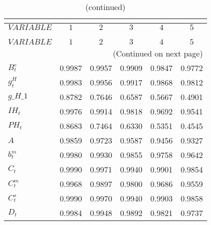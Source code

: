  
\begin{center}
\begin{longtable}{lccccc} 
\caption{AUTOCORRELATION OF SIMULATED VARIABLES}\\
 \label{Table:sim_autocorr_matrix}\\
\toprule 
$VARIABLE                   $	 & 	 $         1$	 & 	 $         2$	 & 	 $         3$	 & 	 $         4$	 & 	 $         5$\\
\midrule \endfirsthead 
\caption{(continued)}\\
 \toprule \\ 
$VARIABLE                   $	 & 	 $         1$	 & 	 $         2$	 & 	 $         3$	 & 	 $         4$	 & 	 $         5$\\
\midrule \endhead 
\midrule \multicolumn{6}{r}{(Continued on next page)} \\ \bottomrule \endfoot 
\bottomrule \endlastfoot 
$B^e_t                      $	 & 	    0.9987	 & 	    0.9957	 & 	    0.9909	 & 	    0.9847	 & 	    0.9772 \\ 
$g^H_t                      $	 & 	    0.9983	 & 	    0.9956	 & 	    0.9917	 & 	    0.9868	 & 	    0.9812 \\ 
$g\_H\_1                    $	 & 	    0.8782	 & 	    0.7646	 & 	    0.6587	 & 	    0.5667	 & 	    0.4901 \\ 
$IH_t                       $	 & 	    0.9976	 & 	    0.9914	 & 	    0.9818	 & 	    0.9692	 & 	    0.9541 \\ 
$PH_t                       $	 & 	    0.8683	 & 	    0.7464	 & 	    0.6330	 & 	    0.5351	 & 	    0.4545 \\ 
$ A                         $	 & 	    0.9859	 & 	    0.9723	 & 	    0.9587	 & 	    0.9456	 & 	    0.9327 \\ 
$ b^m_t                     $	 & 	    0.9980	 & 	    0.9930	 & 	    0.9855	 & 	    0.9758	 & 	    0.9642 \\ 
$ C_t                       $	 & 	    0.9990	 & 	    0.9971	 & 	    0.9940	 & 	    0.9901	 & 	    0.9854 \\ 
$ C^m_t                     $	 & 	    0.9968	 & 	    0.9897	 & 	    0.9800	 & 	    0.9686	 & 	    0.9559 \\ 
$ C^s_t                     $	 & 	    0.9990	 & 	    0.9970	 & 	    0.9940	 & 	    0.9903	 & 	    0.9858 \\ 
$ D_t                       $	 & 	    0.9984	 & 	    0.9948	 & 	    0.9892	 & 	    0.9821	 & 	    0.9737 \\ 

\end{longtable}
\end{center}
